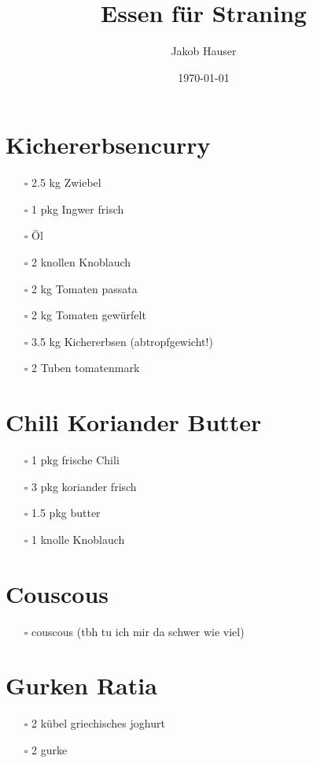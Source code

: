 \documentclass[11pt]{article}
\author{Jakob Hauser}
\date{\today}
\title{Essen für Straning}
\begin{document}
\maketitle
\tableofcontents

\section{Kichererbsencurry}
\label{sec:org3d1a1b1}
\begin{itemize}
\item[{$\square$}] 2.5 kg Zwiebel
\item[{$\square$}] 1 pkg Ingwer frisch
\item[{$\square$}] Öl
\item[{$\square$}] 2 knollen Knoblauch
\item[{$\square$}] 2 kg Tomaten passata
\item[{$\square$}] 2 kg Tomaten gewürfelt
\item[{$\square$}] 3.5 kg Kichererbsen (abtropfgewicht!)
\item[{$\square$}] 2 Tuben tomatenmark
\end{itemize}
\section{Chili Koriander Butter}
\label{sec:org5264cbe}
\begin{itemize}
\item[{$\square$}] 1 pkg frische Chili
\item[{$\square$}] 3 pkg koriander frisch
\item[{$\square$}] 1.5 pkg butter
\item[{$\square$}] 1 knolle Knoblauch
\end{itemize}
\section{Couscous}
\label{sec:orge96cff1}
\begin{itemize}
\item[{$\square$}] couscous (tbh tu ich mir da schwer wie viel)
\end{itemize}
\section{Gurken Ratia}
\label{sec:orgc4e27db}
\begin{itemize}
\item[{$\square$}] 2 kübel griechisches joghurt
\item[{$\square$}] 2 gurke
\end{itemize}
\end{document}
